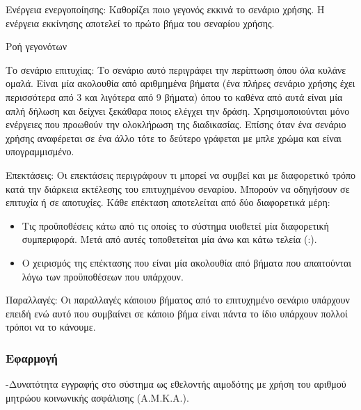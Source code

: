  Ενέργεια ενεργοποίησης: Καθορίζει ποιο γεγονός εκκινά το σενάριο χρήσης. Η ενέργεια εκκίνησης αποτελεί το πρώτο βήμα του σεναρίου χρήσης. 
 
 Ροή γεγονότων
 
 Το σενάριο επιτυχίας: Το σενάριο αυτό περιγράφει την περίπτωση όπου όλα κυλάνε ομαλά. Είναι μία ακολουθία από αριθμημένα βήματα (ένα πλήρες σενάριο χρήσης έχει περισσότερα από 3 και λιγότερα από 9 βήματα) όπου το καθένα από αυτά είναι μία απλή δήλωση και δείχνει ξεκάθαρα ποιος ελέγχει την δράση.  Χρησιμοποιούνται μόνο ενέργειες που προωθούν την ολοκλήρωση της διαδικασίας. Επίσης όταν ένα σενάριο χρήσης αναφέρεται σε ένα άλλο τότε το δεύτερο γράφεται με μπλε χρώμα και είναι υπογραμμισμένο.
 
 Επεκτάσεις: Οι επεκτάσεις περιγράφουν τι μπορεί να συμβεί και με διαφορετικό τρόπο κατά την διάρκεια εκτέλεσης του επιτυχημένου σεναρίου. Μπορούν να οδηγήσουν σε επιτυχία ή σε αποτυχίες. Κάθε επέκταση αποτελείται από δύο διαφορετικά μέρη:
 \begin{itemize}
 \item Τις προϋποθέσεις κάτω από τις οποίες το σύστημα υιοθετεί μία διαφορετική συμπεριφορά. Μετά από αυτές τοποθετείται μία άνω και κάτω τελεία (:).
 \item Ο χειρισμός της επέκτασης που είναι μία ακολουθία από βήματα που απαιτούνται λόγω των προϋποθέσεων που υπάρχουν.
 \end{itemize}
 
 Παραλλαγές: Οι παραλλαγές κάποιου βήματος από το επιτυχημένο σενάριο υπάρχουν επειδή ενώ αυτό που συμβαίνει σε κάποιο βήμα είναι πάντα το ίδιο υπάρχουν πολλοί τρόποι να το κάνουμε.
 
 \subsubsection{Εφαρμογή}


-Δυνατότητα εγγραφής στο σύστημα ως εθελοντής αιμοδότης με χρήση του αριθμού μητρώου κοινωνικής ασφάλισης (Α.Μ.Κ.Α.).


